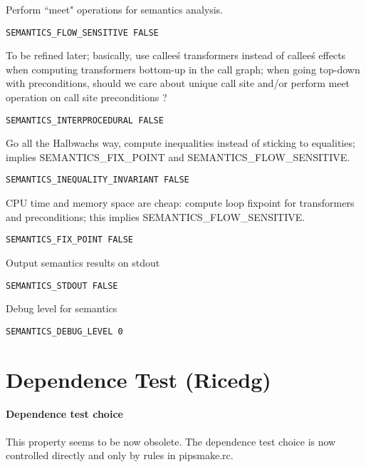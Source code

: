 Perform ``meet" operations for semantics analysis.

\begin{verbatim}
SEMANTICS_FLOW_SENSITIVE FALSE
\end{verbatim}

To be refined later; basically, use callee\'s transformers instead of
callee\'s effects when computing transformers bottom-up in the call graph;
when going top-down with preconditions, should we care about unique
call site and/or perform meet operation on call site preconditions ?

\begin{verbatim}
SEMANTICS_INTERPROCEDURAL FALSE
\end{verbatim}

Go all the Halbwachs way, compute inequalities instead of sticking
to equalities; implies SEMANTICS\_FIX\_POINT and SEMANTICS\_FLOW\_SENSITIVE.

\begin{verbatim}
SEMANTICS_INEQUALITY_INVARIANT FALSE
\end{verbatim}

CPU time and memory space are cheap: compute loop fixpoint for
transformers and preconditions; this implies SEMANTICS\_FLOW\_SENSITIVE.

\begin{verbatim}
SEMANTICS_FIX_POINT FALSE
\end{verbatim}

Output semantics results on stdout

\begin{verbatim}
SEMANTICS_STDOUT FALSE
\end{verbatim}

Debug level for semantics

\begin{verbatim}
SEMANTICS_DEBUG_LEVEL 0
\end{verbatim}

\section{Dependence Test (Ricedg)}


\paragraph{Dependence test choice}

This property seems to be now obsolete. The dependence test choice is
now controlled directly and only by rules in pipsmake.rc.

